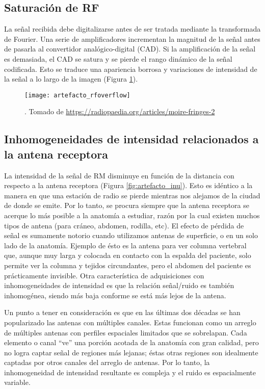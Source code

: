 \subsection{Saturación de RF}
La señal recibida debe digitalizarse antes de ser tratada mediante la transformada de Fourier. Una serie de amplificadores incrementan la magnitud de la señal antes de pasarla al convertidor analógico-digital (CAD). Si la amplificación de la señal es demasiada, el CAD se satura y se pierde el rango dinámico de la señal codificada. Esto se traduce una apariencia borrosa y variaciones de intensidad de la señal a lo largo de la imagen (Figura \ref{fig:artefacto_rfoverflow}).


\begin{figure}[htb]
 \begin{figg}
   \texttt{[image: artefacto\_rfoverflow]}
   \caption{\figurapendiente. Tomado de \url{https://radiopaedia.org/articles/moire-fringes-2}}
 \label{fig:artefacto_rfoverflow}
 \end{figg}
\end{figure}


\subsection{Inhomogeneidades de intensidad relacionados a la antena receptora}
La intensidad de la señal de RM disminuye en función de la distancia con respecto a la antena receptora (Figura \ref{fig:artefacto_inu}). Esto es idéntico a la manera en que una estación de radio se pierde mientras nos alejamos de la ciudad de donde se emite. Por lo tanto, se procura siempre que la antena receptora se acerque lo más posible a la anatomía a estudiar, razón por la cual existen muchos tipos de antena (para cráneo,  abdomen,  rodilla, etc). El efecto de pérdida de señal es sumamente notorio cuando utilizamos antenas de superficie, o en un solo lado de la anatomía. Ejemplo de ésto es la antena para ver columna vertebral que, aunque muy larga y colocada en contacto con la espalda del paciente, solo permite ver la columna y tejidos circundantes, pero el abdomen del paciente es prácticamente invisible. Otra característica de adquisiciones con inhomogeneidades de intensidad es que la relación señal/ruido es también inhomogénea, siendo más baja conforme se está más lejos de la antena.

Un punto a tener en consideración es que en las últimas dos décadas se han popularizado las antenas con múltiples canales. Estas funcionan como un arreglo de múltiples antenas con perfiles espaciales limitados que se sobrelapan. Cada elemento o canal ``ve'' una porción acotada de la anatomía con gran calidad, pero no logra captar señal de regiones más lejanas; éstas otras regiones son idealmente captadas por otros canales del arreglo de antenas. Por lo tanto, la inhomogeneidad de intensidad resultante es compleja y el ruido es espacialmente variable.

